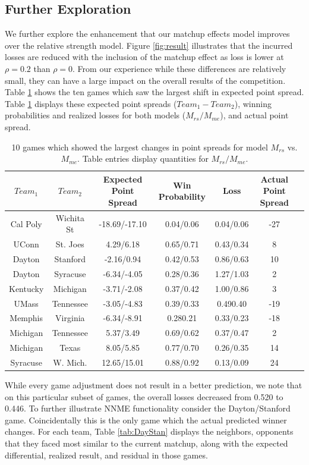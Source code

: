 \documentclass[letterpaper,12pt]{article}
\begin{document}
\subsection{Further Exploration}
We further explore the enhancement that our matchup effects model improves over the relative strength model.  Figure \ref{fig:result} illustrates that the incurred losses are reduced with the inclusion of the matchup effect as loss is lower at $\rho=0.2$ than $\rho=0$. From our experience while these differences are relatively small, they can have a large impact on the overall results of the competition. Table \ref{tab:change} shows the ten games which saw the largest shift in expected point spread. Table \ref{tab:change} displays these expected point spreads ($Team_1 - Team_2$), winning probabilities and realized losses for both models ($M_{rs}/M_{me}$), and actual point spread. 
\begin{table}[h!]
\caption{10 games which showed the largest changes in point spreads for model $M_{rs}$ vs. $M_{me}$. Table entries display quantities for $M_{rs}/M_{me}$.\label{tab:change}}
\scriptsize
\centering
\begin{tabular}{|cc | ccc |c|c|}
  \hline
  \hline
 $Team_1$ & $Team_2$ & Expected Point Spread & Win Probability & Loss & Actual Point Spread\\ 
  \hline
 Cal Poly & Wichita St & -18.69/-17.10  & 0.04/0.06 & 0.04/0.06&  -27\\ 
 UConn & St. Joes &4.29/6.18 & 0.65/0.71 & 0.43/0.34  & 8\\ 
 Dayton & Stanford & -2.16/0.94 & 0.42/0.53 & 0.86/0.63& 10 \\ 
 Dayton & Syracuse & -6.34/-4.05 & 0.28/0.36 & 1.27/1.03& 2\\ 
 Kentucky & Michigan & -3.71/-2.08 & 0.37/0.42 & 1.00/0.86 & 3\\ 
 UMass & Tennessee &-3.05/-4.83 & 0.39/0.33 & 0.490.40 & -19\\ 
 Memphis & Virginia & -6.34/-8.91 & 0.280.21 & 0.33/0.23 & -18\\ 
 Michigan & Tennessee & 5.37/3.49 & 0.69/0.62 & 0.37/0.47 & 2\\ 
 Michigan & Texas & 8.05/5.85 & 0.77/0.70 & 0.26/0.35 & 14\\ 
 Syracuse & W. Mich. & 12.65/15.01 & 0.88/0.92 & 0.13/0.09& 24\\ 
   \hline
   \hline
\end{tabular}
\end{table}
While every game adjustment does not result in a better prediction,  we note that on this particular subset of games, the overall losses decreased from 0.520 to 0.446. To further illustrate NNME functionality consider the Dayton/Stanford game.  Coincidentally this is the only game which the actual predicted winner changes. For each team, Table \ref{tab:DayStan} displays the neighbors, opponents that they faced most similar to the current matchup, along with the expected differential, realized result, and residual in those games. 
\end{document}
